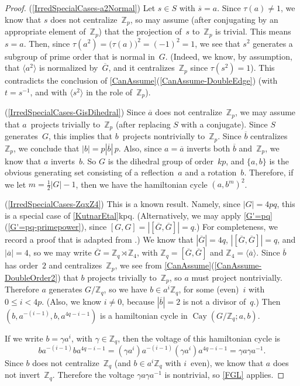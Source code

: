 \documentclass[]{amcjoucc}
\newcommand{\pref}[1]{(\ref{#1})}
\newcommand{\fullcref}[2]{\cref{#1}\pref{#1-#2}}
\theoremstyle{plain}
\theoremstyle{definition}
\theoremstyle{definition}
\DeclareMathOperator{\Cay}{Cay}
\newcommand{\quot}{\overline}
\newcommand{\ZZ}{\mathbb{Z}}
\begin{document}
\begin{proof}
\pref{IrredSpecialCases-a2Normal} Let $s \in S$ with $\quot s = a$. Since $\tau(a) \neq 1$, we know that $s$ does not centralize~$\ZZ_p$, so may assume (after conjugating by an appropriate element of~$\ZZ_p$) that the projection of~$s$ to~$\ZZ_p$ is trivial. This means $s = a$. Then, since $\tau(a^2) = \bigl(\tau(a)\bigr)^2 = (-1)^2 = 1$, we see that $s^2$ generates a subgroup of prime order that is normal in~$G$. (Indeed, we know, by assumption, that $\langle a^2\rangle$ is normalized by~$\quot G$, and it centralizes~$\ZZ_p$ since $\tau(s^2) = 1$).  This contradicts the conclusion of \fullcref{CanAssume}{DoubleEdge} (with $t = s^{-1}$, and with $\langle s^2 \rangle$ in the role of~$\ZZ_p$).

\pref{IrredSpecialCases-GisDihedral} Since $\quot a$ does not centralize~$\ZZ_p$, we may assume that $a$~projects trivially to~$\ZZ_p$ (after replacing $S$ with a conjugate). Since $S$ generates~$G$, this implies that $b$~projects nontrivially to~$\ZZ_p$. Since $\quot b$ centralizes~$\ZZ_p$, we conclude that $|b| = p |\quot b| \, p$. Also, since $a = \quot a$ inverts both $\quot b$ and~$\ZZ_p$, we know that $a$ inverts~$b$. So $G$ is the dihedral group of order~$kp$, and $\{a,b\}$ is the obvious generating set consisting of a reflection~$a$ and a rotation~$b$. Therefore, if we let $m = \frac{1}{2}|G| - 1$, then we have the hamiltonian cycle $(a, b^m)^2$.

\pref{IrredSpecialCases-ZqxZ4} This is a known result. Namely, since $|G| = 4pq$, this is a special case of \cref{KutnarEtal}{kpq}.  (Alternatively, we may apply \fullcref{G'=pq}{primepower}, since $[G,G] = |[\quot G, \quot G]| = q$.) For completeness, we record a proof that is adapted from \cite[Case 5.3]{KeatingWitte}.)
We know that $|\quot G| = 4q$, $|[\quot G, \quot G]| = q$, and $|\quot a| = 4$, so we may write $\quot G = \ZZ_q \rtimes \ZZ_4$, with $\ZZ_q = [\quot G, \quot G]$ and $\ZZ_4 = \langle \quot a \rangle$.
Since $\quot b$ has order~$2$ and centralizes~$\ZZ_p$, we see from \fullcref{CanAssume}{DoubleOrder2} that $b$ projects trivially to~$\ZZ_p$, so $a$ must project nontrivially. Therefore $a$ generates $G/\ZZ_q$, so we have $b \in a^i \ZZ_q$, for some (even)~$i$ with $0 \le i < 4p$. (Also, we know $i \neq 0$, because $|\quot b| = 2$ is not a divisor of~$q$.)  Then $(b, a^{-(i-1)}, b, a^{4q-i-1})$ is a hamiltonian cycle in $\Cay(G/\ZZ_q; a,b)$. 

If we write $b = \gamma a^i$, with $\gamma \in \ZZ_q$, then the voltage of this hamiltonian cycle is
	$$ b  a^{-(i-1)}  b a^{4q-i-1} 
	= (\gamma a^i)  a^{-(i-1)}  (\gamma a^i) a^{4q-i-1} 
	= \gamma a  \gamma a^{-1}
	. $$
Since $b$ does not centralize~$\ZZ_q$ (and $b \in a^i \ZZ_q$ with $i$~even), we know that $a$ does not invert~$\ZZ_q$. Therefore the voltage $\gamma a  \gamma a^{-1}$ is nontrivial, so \cref{FGL} applies.
\end{proof}
\end{document}
